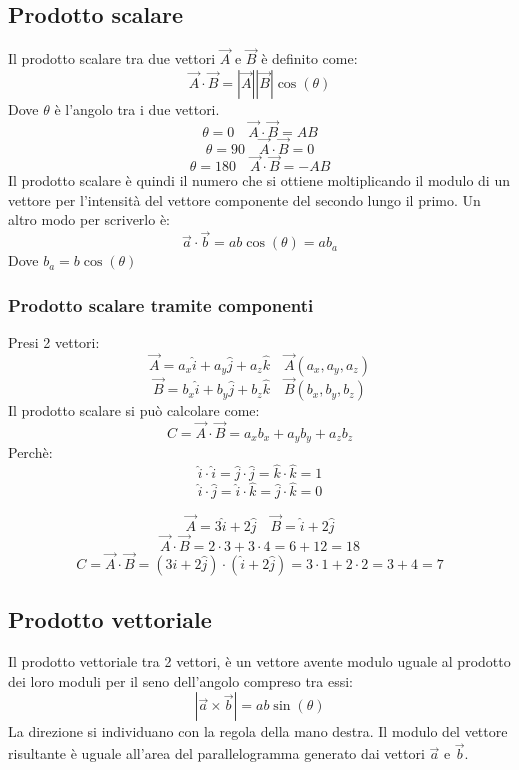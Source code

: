 \documentclass[a4paper]{article}
\theoremstyle{break}
\theoremstyle{break}
\theoremstyle{break}
\theoremstyle{break}
\begin{document}
\subsection{Prodotto scalare}
Il prodotto scalare tra due vettori \( \vec{A} \) e \( \vec{B} \) è definito come:
\[
	\vec{A} \cdot \vec{B} = |\vec{A}| |\vec{B}|\cos(\theta)
\]
Dove \( \theta \) è l'angolo tra i due vettori.
\[
	\theta = 0 \quad \vec{A} \cdot \vec{B} = AB
\]
\[
	\theta = 90\quad \vec{A} \cdot \vec{B} = 0
\]
\[
	\theta = 180\quad \vec{A} \cdot \vec{B} = -AB
\]
Il prodotto scalare è quindi il numero che si ottiene moltiplicando il modulo di un vettore per
l'intensità del vettore componente del secondo lungo il primo. Un altro modo per scriverlo è:
\[
	\vec{a} \cdot \vec{b} = ab\cos(\theta) = ab_a
\]
Dove \( b_a = b\cos(\theta) \)

\subsubsection{Prodotto scalare tramite componenti}
Presi 2 vettori:
\[
	\vec{A} = a_x\hat{i} + a_y\hat{j} + a_z\hat{k} \quad \vec{A}(a_x,a_y,a_z)
\]
\[
	\vec{B} = b_x\hat{i} + b_y\hat{j} + b_z\hat{k} \quad \vec{B}(b_x,b_y,b_z)
\]
Il prodotto scalare si può calcolare come:
\[
	C = \vec{A} \cdot \vec{B} = a_xb_x + a_yb_y + a_zb_z
\]
Perchè:
\[
	\hat{i} \cdot \hat{i} = \hat{j} \cdot \hat{j} = \hat{k} \cdot \hat{k} = 1
\]
\[
	\hat{i} \cdot \hat{j} = \hat{i} \cdot \hat{k} = \hat{j} \cdot \hat{k} = 0
\]

\begin{figure}[H]
	\begin{example}
		\[
			\vec{A} = 3\hat{i} + 2\hat{j} \quad \vec{B} = \hat{i} + 2\hat{j}
		\]
		\[
			\vec{A} \cdot \vec{B} = 2\cdot3 + 3\cdot4 = 6 + 12 = 18
		\]
		\[
			C = \vec{A} \cdot \vec{B} = (3\hat{i} + 2\hat{j}) \cdot (\hat{i} + 2\hat{j}) = 3\cdot1 + 2\cdot2 = 3 + 4 = 7
		\]
	\end{example}
\end{figure}

\subsection{Prodotto vettoriale}
Il prodotto vettoriale tra 2 vettori, è un vettore avente modulo uguale al prodotto dei loro
moduli per il seno dell'angolo compreso tra essi:
\[
	|\vec{a} \times \vec{b}| = ab \sin(\theta)
\]
La direzione si individuano con la regola della mano destra.
\label{D7}
Il modulo del vettore risultante è uguale all'area del parallelogramma generato dai vettori \( \vec{a} \) e \( \vec{b} \).
\end{document}
